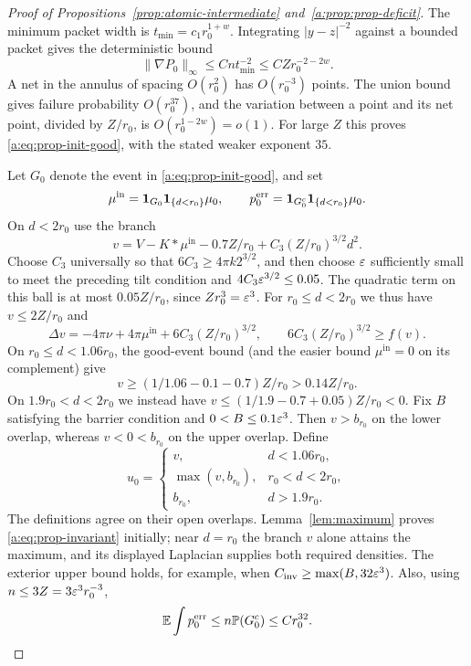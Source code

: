 \begin{proof}[Proof of Propositions~\ref{prop:atomic-intermediate} and~\ref{a:prop:prop-deficit}]
The minimum packet width is $t_{\min}=c_1r_0^{1+w}$.  Integrating
$|y-z|^{-2}$ against a bounded packet gives the deterministic bound
\[
 \|\nabla P_0\|_\infty\le Cn t_{\min}^{-2}
 \le C Z r_0^{-2-2w}.
\]
A net in the annulus of spacing $O(r_0^2)$ has $O(r_0^{-3})$ points.
The union bound gives failure probability $O(r_0^{37})$, and the
variation between a point and its net point, divided by $Z/r_0$, is
$O(r_0^{1-2w})=o(1)$.  For large $Z$ this proves
\eqref{a:eq:prop-init-good}, with the stated weaker exponent $35$.

Let $G_0$ denote the event in \eqref{a:eq:prop-init-good}, and set
\[
 \mu^{\mathrm{in}}=\mathbf 1_{G_0}\mathbf 1_{\{d<r_0\}}\mu_0,
 \qquad p_0^{\mathrm{err}}=\mathbf 1_{G_0^c}\mathbf 1_{\{d<r_0\}}\mu_0.
\]
On $d<2r_0$ use the branch
\[
 v=V-K*\mu^{\mathrm{in}}-0.7Z/r_0
            +C_3(Z/r_0)^{3/2}d^2.
\]
Choose $C_3$ universally so that $6C_3\ge4\pi k2^{3/2}$, and then
choose $\varepsilon$ sufficiently small to meet the preceding tilt
condition and $4C_3\varepsilon^{3/2}\le0.05$.  The quadratic term on this
ball is at most $0.05Z/r_0$, since $Zr_0^3=\varepsilon^3$.
For $r_0\le d<2r_0$ we thus have $v\le2Z/r_0$ and
\[
 \Delta v=-4\pi\nu+4\pi\mu^{\mathrm{in}}
                +6C_3(Z/r_0)^{3/2},
 \qquad 6C_3(Z/r_0)^{3/2}\ge f(v).
\]
On $r_0\le d<1.06r_0$, the good-event bound (and the easier bound
$\mu^{\mathrm{in}}=0$ on its complement) give
\[
 v\ge(1/1.06-0.1-0.7)Z/r_0>0.14Z/r_0.
\]
On $1.9r_0<d<2r_0$ we instead have
$v\le(1/1.9-0.7+0.05)Z/r_0<0$.
Fix $B$ satisfying the barrier condition and $0<B\le0.1\varepsilon^3$.
Then $v>b_{r_0}$ on the lower overlap, whereas $v<0<b_{r_0}$ on
the upper overlap.  Define
\[
 u_0=\begin{cases}
 v,&d<1.06r_0,\\
 \max(v,b_{r_0}),&r_0<d<2r_0,\\
 b_{r_0},&d>1.9r_0.
 \end{cases}
\]
The definitions agree on their open overlaps.
Lemma~\ref{lem:maximum} proves \eqref{a:eq:prop-invariant} initially;
near $d=r_0$ the branch $v$ alone attains the maximum, and its displayed
Laplacian supplies both required densities.  The exterior upper bound
holds, for example, when
$C_{\mathrm{inv}}\ge\max(B,32\varepsilon^3)$.
Also, using $n\le3Z=3\varepsilon^3r_0^{-3}$,
\begin{equation}
\label{a:eq:prop-initial-error}
 \mathbb E\int p_0^{\mathrm{err}}
 \le n\mathbb P(G_0^c)\le C r_0^{32}.
\end{equation}


\end{proof}
